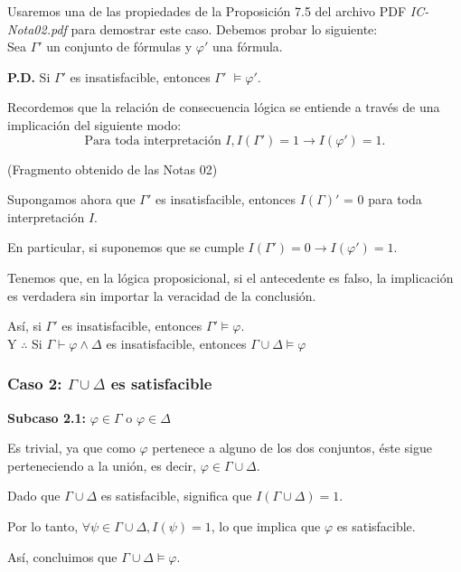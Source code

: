 \documentclass[11pt,letterpaper]{article}
\begin{document}
\begin{enumerate}
\begin{itemize}
      Usaremos una de las propiedades de la Proposición 7.5 del archivo PDF \textit{IC-Nota02.pdf} para demostrar este caso. Debemos probar lo siguiente:\\

      Sea $\Gamma'$ un conjunto de fórmulas y $\varphi'$ una fórmula. 

      \textbf{P.D.} Si $\Gamma'$ es insatisfacible, entonces $\Gamma'$ $\vDash \varphi'$.

      Recordemos que la relación de consecuencia lógica se entiende a través de una implicación del siguiente modo:
      \[
      \text{Para toda interpretación } I, I(\Gamma') = 1 \rightarrow I(\varphi') = 1.
      \]

      (Fragmento obtenido de las Notas 02)

      Supongamos ahora que $\Gamma'$ es insatisfacible, entonces $I(\Gamma)'$ = 0 para toda interpretación $I$.

      En particular, si suponemos que se cumple $I(\Gamma') = 0 \rightarrow I(\varphi') = 1$.
      
      Tenemos que, en la lógica proposicional, si el antecedente es falso, la implicación es verdadera sin importar la veracidad de la conclusión.
      
      Así, si $\Gamma'$ es insatisfacible, entonces $\Gamma' \vDash \varphi$.\\

      Y $\therefore$ Si $\Gamma \vdash \varphi \land \Delta$ es insatisfacible, entonces $\Gamma \cup \Delta \models \varphi$

      \subsubsection*{Caso 2: $\Gamma \cup \Delta$ es satisfacible}

      \textbf{Subcaso 2.1:} $\varphi \in \Gamma$ o $\varphi \in \Delta$

      Es trivial, ya que como $\varphi$ pertenece a alguno de los dos conjuntos, éste sigue perteneciendo a la unión, es decir, $\varphi \in \Gamma \cup \Delta$.
      
      Dado que $\Gamma \cup \Delta$ es satisfacible, significa que $I(\Gamma \cup \Delta) = 1$.
      
      Por lo tanto, $\forall  \psi \in \Gamma \cup \Delta, I(\psi) = 1$, lo que implica que $\varphi$ es satisfacible.  

      Así, concluimos que $\Gamma \cup \Delta \vDash \varphi$.


\end{itemize}
\end{enumerate}
\end{document}

